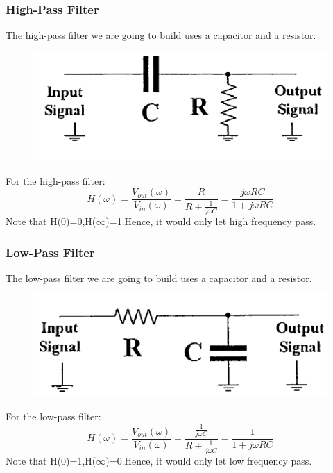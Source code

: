 \documentclass[12pt]{article}
\begin{document}
\subsubsection{High-Pass Filter}
The high-pass filter we are going to build uses a capacitor and a resistor.
\begin{figure}[H]
\centering
\includegraphics[scale=0.5]{P3.jpg}
\end{figure}
For the high-pass filter:
$$H(\omega)=\frac{V_{out}(\omega)}{V_{in}(\omega)}=\frac{R}{R+\frac{1}{j\omega C}}=\frac{j\omega RC}{1+j\omega RC}$$
Note that H(0)=0,H($\infty$)=1.Hence, it would only let high frequency pass.
\subsubsection{Low-Pass Filter}
The low-pass filter we are going to build uses a capacitor and a resistor.
\begin{figure}[H]
\centering
\includegraphics[scale=0.5]{P4.jpg}
\end{figure}
For the low-pass filter:
$$H(\omega)=\frac{V_{out}(\omega)}{V_{in}(\omega)}=\frac{\frac{1}{j\omega C}}{R+\frac{1}{j\omega C}}=\frac{1}{1+j\omega RC}$$
Note that H(0)=1,H($\infty$)=0.Hence, it would only let low frequency pass.
\end{document}
